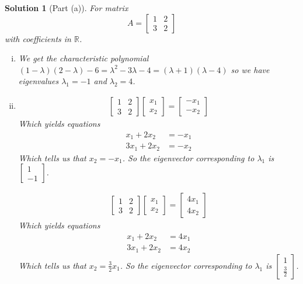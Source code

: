 \documentclass[leqno]{article}
\theoremstyle{nonumberplain}
\newtheorem{solution}{Solution}
\begin{document}
\begin{solution}[Part (a)] For matrix 
\[A=\begin{bmatrix}
1 & 2 \\
3 & 2 
\end{bmatrix}
\]
with coefficients in $\mathbb{R}$. 
\begin{enumerate}[i)]
\item We get the characteristic polynomial $(1-\lambda)(2-\lambda)-6=\lambda^2-3\lambda-4=(\lambda+1)(\lambda-4)$ so we have eigenvalues $\lambda_1=-1$ and $\lambda_2=4$.

\item 
\begin{align*}
\begin{bmatrix}
1 & 2\\
3 & 2
\end{bmatrix}
\begin{bmatrix}
x_1\\
x_2
\end{bmatrix}
=\begin{bmatrix}
-x_1\\
-x_2
\end{bmatrix}
\end{align*}
Which yields equations
\begin{align*}
x_1+2x_2&=-x_1\\
3x_1+2x_2&=-x_2
\end{align*}
Which tells us that $x_2=-x_1$.  So the eigenvector corresponding to $\lambda_1$ is $\begin{bmatrix}
1\\
-1\end{bmatrix}$.

\begin{align*}
\begin{bmatrix}
1 & 2\\
3 & 2
\end{bmatrix}
\begin{bmatrix}
x_1\\
x_2
\end{bmatrix}
=\begin{bmatrix}
4x_1\\
4x_2
\end{bmatrix}
\end{align*}
Which yields equations
\begin{align*}
x_1+2x_2&=4x_1\\
3x_1+2x_2&=4x_2
\end{align*}
Which tells us that $x_2=\frac{3}{2}x_1$.  So the eigenvector corresponding to $\lambda_1$ is $\begin{bmatrix}
1\\
\frac{3}{2}\end{bmatrix}$.


\end{enumerate}
\end{solution}
\end{document}
